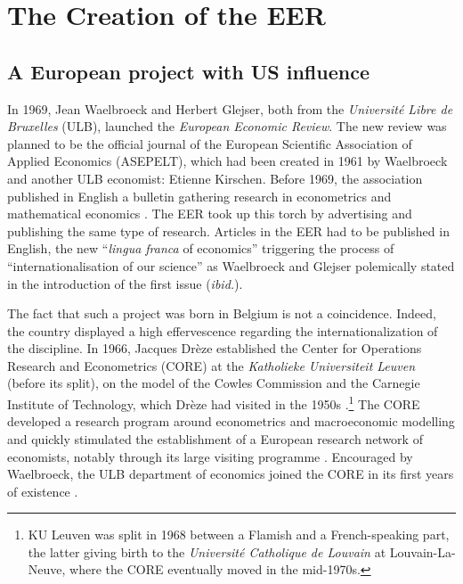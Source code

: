 \documentclass[]{elsarticle} %
\begin{document}
\hypertarget{EER-creation}{%
\section{The Creation of the EER}\label{EER-creation}}

\hypertarget{a-european-project-with-us-influence}{%
\subsection{A European project with US
influence}\label{a-european-project-with-us-influence}}

In 1969, Jean Waelbroeck and Herbert Glejser, both from the
\emph{Université Libre de Bruxelles} (ULB), launched the \emph{European
Economic Review}. The new review was planned to be the official journal
of the European Scientific Association of Applied Economics (ASEPELT),
which had been created in 1961 by Waelbroeck and another ULB economist:
Etienne Kirschen. Before 1969, the association published in English a
bulletin gathering research in econometrics and mathematical economics
\citep[4]{waelbroeck1969}. The EER took up this torch by advertising and
publishing the same type of research. Articles in the EER had to be
published in English, the new ``\emph{lingua franca} of economics''
triggering the process of ``internationalisation of our science'' as
Waelbroeck and Glejser polemically stated in the introduction of the
first issue (\emph{ibid.}).

The fact that such a project was born in Belgium is not a coincidence.
Indeed, the country displayed a high effervescence regarding the
internationalization of the discipline. In 1966, Jacques Drèze
established the Center for Operations Research and Econometrics (CORE)
at the \emph{Katholieke Universiteit Leuven} (before its split), on the
model of the Cowles Commission and the Carnegie Institute of Technology,
which Drèze had visited in the 1950s \citep{duppe2017}.\footnote{KU
  Leuven was split in 1968 between a Flamish and a French-speaking part,
  the latter giving birth to the \emph{Université Catholique de Louvain}
  at Louvain-La-Neuve, where the CORE eventually moved in the mid-1970s.}
The CORE developed a research program around econometrics and
macroeconomic modelling and quickly stimulated the establishment of a
European research network of economists, notably through its large
visiting programme \citep{maes2005, duppe2017}. Encouraged by
Waelbroeck, the ULB department of economics joined the CORE in its first
years of existence \citep[79]{maes2005}.
\end{document}
